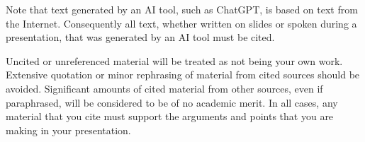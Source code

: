 \documentclass{csse4400}
\begin{document}
Note that text generated by an AI tool, such as ChatGPT, is based on text from the Internet.
Consequently all text, whether written on slides or spoken during a presentation,
that was generated by an AI tool must be cited.

Uncited or unreferenced material will be treated as not being your own work.
Extensive quotation or minor rephrasing of material from cited sources should be avoided.
Significant amounts of cited material from other sources, even if paraphrased, will be considered to be of no academic merit.
In all cases, any material that you cite must support the arguments and points that you are making in your presentation.







\end{document}
